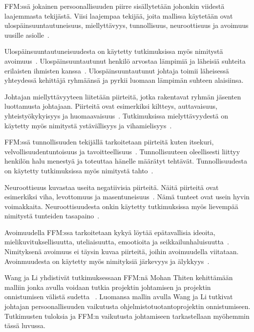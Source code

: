 \documentclass[finnish]{tktltiki2}
\theoremstyle{definition}
\theoremstyle{remark}
\begin{document}
FFM:ssä jokainen persoonallisuuden piirre sisällytetään johonkin viidestä laajemmasta tekijästä. Viisi laajempaa tekijää, joita mallissa käytetään ovat ulospäinsuuntautuneisuus, miellyttävyys, tunnollisuus, neuroottisuus ja avoimuus uusille asiolle~\cite{barrick2006big, digman1990personality}.

Ulospäinsuuntautuneisuudesta on käytetty tutkimuksissa myös nimitystä avoimuus~\cite{digman1990personality}. Ulospäinsuuntautunut henkilö arvostaa lämpimiä ja läheisiä suhteita erilaisten ihmisten kanssa~\cite{Wang:2009:PMP:1639950.1640049}. Ulospäinsuuntautunut johtaja toimii läheisessä yhteydessä kehittäjä ryhmäänsä ja pyrkii luomaan lämpimän suhteen alaisiinsa.

Johtajan miellyttävyyteen liitetään piirteitä, jotka rakentavat ryhmän jäsenten luottamusta johtajaan. Piirteitä ovat esimerkiksi kiltteys, auttavaisuus, yhteistyökykyisyys ja huomaavaisuus~\cite{Wang:2009:PMP:1639950.1640049}. Tutkimuksissa mielyttävyydestä on käytetty myös nimitystä ystävällisyys ja vihamielisyys~\cite{digman1990personality}.

FFM:ssä tunnollisuuden tekijällä tarkoitetaan piirteitä kuten itsekuri, velvollisuudentuntoisuus ja tavoitteellisuus~\cite{Wang:2009:PMP:1639950.1640049}. Tunnollisuuteen oleellisesti liittyy henkilön halu menestyä ja toteuttaa hänelle määrätyt tehtävät. Tunnollisuudesta on käytetty tutkimuksissa myös nimitystä tahto~\cite{digman1990personality}.

Neuroottisuus kuvastaa useita negatiivisia piirteitä. Näitä piirteitä ovat esimerkiksi viha, levottomuus ja masentuneisuus~\cite{Wang:2009:PMP:1639950.1640049}. Nämä tunteet ovat usein hyvin voimakkaita. Neuroottisuudesta onkin käytetty tutkimuksissa myös lievempää nimitystä tunteiden tasapaino~\cite{digman1990personality}.

Avoimuudella FFM:ssa tarkoitetaan kykyä löytää epätavallisia ideoita, mielikuvituksellisuutta, uteliaisuutta, emootioita ja seikkailunhaluisuutta~\cite{Wang:2009:PMP:1639950.1640049}. Nimityksenä avoimuus ei täysin kuvaa piirteitä, joihin avoimuudella viitataan. Avoinmuudesta on käytetty myös nimityksiä järkevyys ja älykkyys~\cite{digman1990personality}.

Wang ja Li yhdistivät tutkimuksessaan FFM:nä Mohan Thiten kehittämään malliin jonka avulla voidaan tutkia projektin johtamisen ja projektin onnistumisen välistä sudetta ~\cite{Wang:2009:PMP:1639950.1640049}. Luomansa mallin avulla Wang ja Li tutkivat johtajan persoonallisuuden vaikutusta ohjelmistotuotantoprojektin onnistumiseen. Tutkimusten tuloksia ja FFM:n vaikutusta johtamiseen tarkastellaan myöhemmin tässä luvussa.
\end{document}
